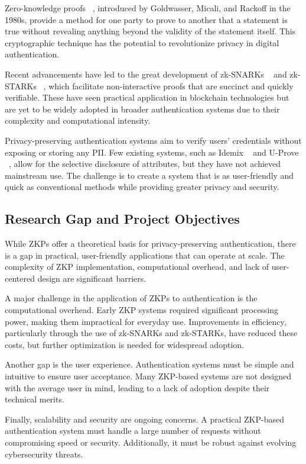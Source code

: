 Zero-knowledge proofs ~\cite{goldwasser1989zkp}, introduced by Goldwasser, Micali, and Rackoff in the 1980s, provide a method for one party to prove to another that a statement is true without revealing anything beyond the validity of the statement itself. This cryptographic technique has the potential to revolutionize privacy in digital authentication.

Recent advancements have led to the great development of zk-SNARKs ~\cite{petkus2019zksnark,chen2023reviewzksnark} and zk-STARKs ~\cite{berentsen2022walkthroughzkstark,cryptoeprint2018zkstark}, which facilitate non-interactive proofs that are succinct and quickly verifiable. These have seen practical application in blockchain technologies but are yet to be widely adopted in broader authentication systems due to their complexity and computational intensity.

Privacy-preserving authentication systems aim to verify users' credentials without exposing or storing any PII. Few existing systems, such as Idemix ~\cite{camenisch2002idemix} and U-Prove ~\cite{paquin2011uprove1,paquin2011uprove2}, allow for the selective disclosure of attributes, but they have not achieved mainstream use. The challenge is to create a system that is as user-friendly and quick as conventional methods while providing greater privacy and security.

\subsection{Research Gap and Project Objectives}
\label{subsec:gap}

While ZKPs offer a theoretical basis for privacy-preserving authentication, there is a gap in practical, user-friendly applications that can operate at scale. The complexity of ZKP implementation, computational overhead, and lack of user-centered design are significant barriers.

A major challenge in the application of ZKPs to authentication is the computational overhead. Early ZKP systems required significant processing power, making them impractical for everyday use. Improvements in efficiency, particularly through the use of zk-SNARKs and zk-STARKs, have reduced these costs, but further optimization is needed for widespread adoption.

Another gap is the user experience. Authentication systems must be simple and intuitive to ensure user acceptance. Many ZKP-based systems are not designed with the average user in mind, leading to a lack of adoption despite their technical merits.

Finally, scalability and security are ongoing concerns. A practical ZKP-based authentication system must handle a large number of requests without compromising speed or security. Additionally, it must be robust against evolving cybersecurity threats.
